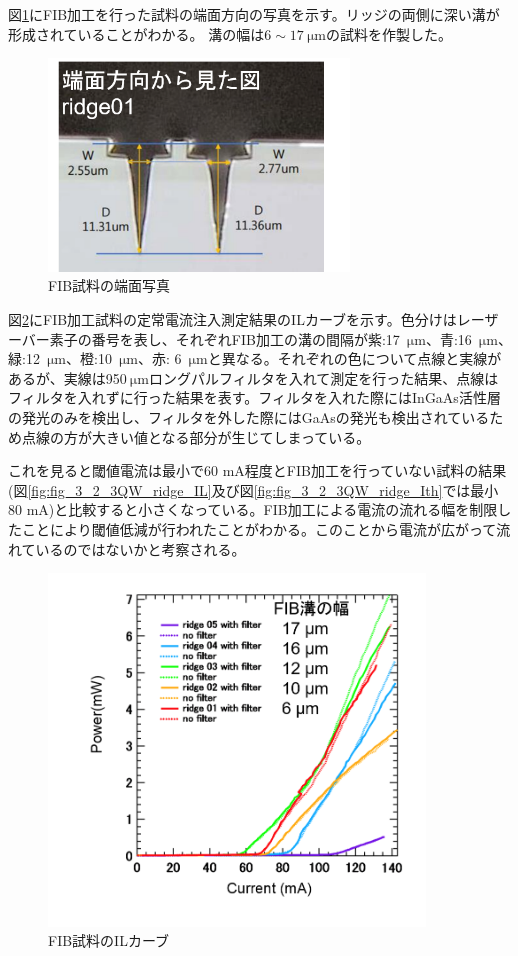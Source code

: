 図\ref{fig:fig_5_2_FIB_facet}にFIB加工を行った試料の端面方向の写真を示す。リッジの両側に深い溝が形成されていることがわかる。
溝の幅は$6\sim17\ \si{\micro\metre}$の試料を作製した。
\begin{figure}[h]
	\centering
	\includegraphics[width=8cm]{figure/fig_5_2_FIB_facet.png}
	\caption{FIB試料の端面写真}
	\label{fig:fig_5_2_FIB_facet}
\end{figure}


図\ref{fig:fig_5_2_FIB_IL}にFIB加工試料の定常電流注入測定結果のILカーブを示す。色分けはレーザーバー素子の番号を表し、それぞれFIB加工の溝の間隔が紫:17\ $\si{\micro\metre}$、青:16\ $\si{\micro\metre}$、緑:12\ $\si{\micro\metre}$、橙:10\ $\si{\micro\metre}$、赤: 6\ $\si{\micro\metre}$と異なる。それぞれの色について点線と実線があるが、実線は950$\ \si{\micro\metre}$ロングパルフィルタを入れて測定を行った結果、点線はフィルタを入れずに行った結果を表す。フィルタを入れた際にはInGaAs活性層の発光のみを検出し、フィルタを外した際にはGaAsの発光も検出されているため点線の方が大きい値となる部分が生じてしまっている。

これを見ると閾値電流は最小で60 mA程度とFIB加工を行っていない試料の結果(図\ref{fig:fig_3_2_3QW_ridge_IL}及び図\ref{fig:fig_3_2_3QW_ridge_Ith}では最小80 mA)と比較すると小さくなっている。FIB加工による電流の流れる幅を制限したことにより閾値低減が行われたことがわかる。このことから電流が広がって流れているのではないかと考察される。
\begin{figure}[h]
	\centering
	\includegraphics[width=10cm]{figure/fig_5_2_FIB_IL.png}
	\caption{FIB試料のILカーブ}
	\label{fig:fig_5_2_FIB_IL}
\end{figure}



